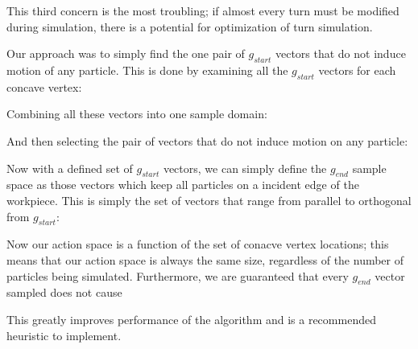 This third concern is the most troubling; if almost every turn must be modified during simulation, there is a potential for optimization of turn simulation.

Our approach was to simply find the one pair of $g_{start}$ vectors that do not induce motion of any particle. This is done by examining all the $g_{start}$ vectors for each concave vertex:


Combining all these vectors into one sample domain:


And then selecting the pair of vectors that do not induce motion on any particle:


Now with a defined set of $g_{start}$ vectors, we can simply define the $g_{end}$ sample space as those vectors which keep all particles on a incident edge of the workpiece. This is simply the set of vectors that range from parallel to orthogonal from $g_{start}$:


Now our action space is a function of the set of conacve vertex locations; this means that our action space is always the same size, regardless of the number of particles being simulated. Furthermore, we are guaranteed that every $g_{end}$ vector sampled does not cause

 This greatly improves performance of the algorithm and is a recommended heuristic to implement.


